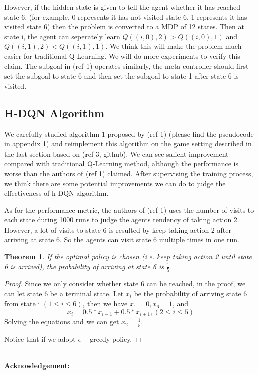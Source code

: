 \documentclass{article}
\newcommand{\Acknowledgement}[1]{\ \\{\bf Acknowledgement:} #1}
\newtheorem{theorem}{Theorem}
\begin{document}
\begin{spacing}{1.1}
    However, if the hidden state is given to tell the agent whether it has reached state 6, (for example, 0 represents it has not visited state 6, 1 represents it has visited state 6) then the problem is converted to a MDP of 12 states. Then at state i, the agent can seperately learn $Q((i, 0), 2) > Q((i, 0), 1)$ and $Q((i, 1), 2) < Q((i, 1), 1)$. We think this will make the problem much easier for traditional Q-Learning. We will do more experiments to verify this claim. The subgoal in (ref 1) operates similarly, the meta-controller should first set the subgoal to state 6 and then set the subgoal to state 1 after state 6 is visited.
    \subsection*{H-DQN Algorithm}
    We carefully studied algorithm 1 proposed by (ref 1) (please find the pseudocode in appendix 1) and reimplement this algorithm on the game setting described in the last section based on (ref 3, github). We can see salient improvement compared with traditional Q-Learning method, although the performance is worse than the authors of (ref 1) claimed. After supervising the training process, we think there are some potential improvements we can do to judge the effectiveness of h-DQN algorithm.

    As for the performance metric, the authors of (ref 1) uses the number of visits to each state during 1000 runs to judge the agents tendency of taking action 2. However, a lot of visits to state 6 is resulted by keep taking action 2 after arriving at state 6. So the agents can visit state 6 multiple times in one run. 
    \begin{theorem}
    If the optimal policy is chosen (i.e. keep taking action 2 until state 6 is arrived), the probability of arriving at state 6 is $\frac{1}{5}$. 
    \end{theorem}
    \begin{proof}
        Since we only consider whether state 6 can be reached, in the proof, we can let state 6 be a terminal state. Let $x_i$ be the probability of arriving state 6 from state i $(1\leq i \leq 6)$, then we have $x_1 = 0, x_6 = 1$, and
        \begin{equation}
            x_i = 0.5 * x_{i-1} + 0.5 * x_{i+1}, (2\leq i \leq 5)
        \end{equation}
        Solving the equations and we can get $x_2 = \frac{1}{5}$.

        Notice that if we adopt $\epsilon -$greedy policy, 
    \end{proof}
    \Acknowledgement{}


    \end{spacing}
    
\end{document}
